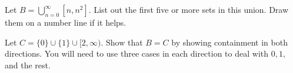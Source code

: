 \yourname


\blist{5.5in}
\item
Let $B = \bigcup_{n=0}^{\infty} [n, n^2]$.
List out the first five or more sets in this union.
Draw them on a number line if it helps.

Let $C = \{0\} \cup \{1\} \cup [2,\infty)$.
Show that $B = C$ by showing containment in both directions.
You will need to use three cases in each direction to deal with $0, 1,$ and the rest.
\elist

\vfill          %
